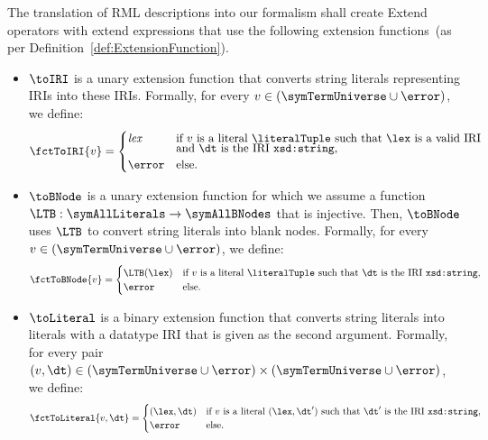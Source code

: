 The translation of RML descriptions into our formalism shall create Extend operators with extend expressions that use the following extension functions~(as per Definition~\ref{def:ExtensionFunction}).
\begin{itemize}
	\item
	$\toIRI$ is a unary extension function that converts string literals representing IRIs into these IRIs. Formally,  for every $v \in (\symTermUniverse \cup \error)$, we define:
\begin{equation*}
	\fctToIRI{v} =
	\begin{cases}
		\mathit{lex}
		& \text{if $v$ is a literal $\literalTuple$ such that $\lex$ is a valid IRI}
		\\[-2mm]
		& \text{and $\dt$ is the IRI \texttt{xsd:string},}
		\\
		\error
		& \text{else.}
	\end{cases}
\end{equation*}

	\item
	$\toBNode$ is a unary extension function for which we assume a function $\LTB: \symAllLiterals \rightarrow \symAllBNodes$ that is injective. Then, $\toBNode$ uses $\LTB$ to convert string literals into blank nodes. Formally, for every $v \in (\symTermUniverse \cup \error)$, we define:
\begin{equation*}
	\fctToBNode{v} =
	\begin{cases}
		\LTB(\lex)
		& \text{if $v$ is a literal $\literalTuple$ such that $\dt$ is the IRI \texttt{xsd:string},}
        \\ 
		\error
		& \text{else.}
	\end{cases}
\end{equation*}

	\item
	$\toLiteral$ is a binary extension function that converts string literals into literals with a datatype IRI that is given as the second argument. Formally, for every pair $(v, \dt)\in (\symTermUniverse \cup \error) \times (\symTermUniverse \cup \error)$, we define:
\begin{equation*}
    \fctToLiteral{v, \dt} = 
    \begin{cases}
        (\lex, \dt) &\text{if $v$ is a literal~$(\lex, \dt')$ such that $\dt'$ is the IRI \texttt{xsd:string}}, \\
        \error & \text{else.}
    \end{cases}
\end{equation*}


\end{itemize}
